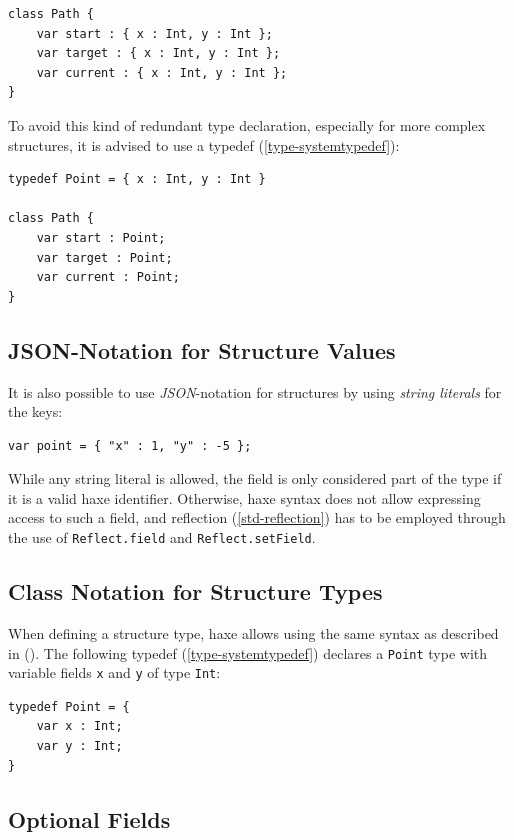\documentclass[a4paper,oneside]{book}
\newcommand{\type}[1]{\texttt{#1}}
\newcommand{\expr}[1]{\texttt{#1}}
\newcommand{\Fullref}[1]{\nameref{#1} (\Cref{#1})}
\newcommand{\tref}[2]{#1 (\ref{#2})}
\begin{document}
\begin{lstlisting}
class Path {
    var start : { x : Int, y : Int };
    var target : { x : Int, y : Int };
    var current : { x : Int, y : Int };
}
\end{lstlisting}
To avoid this kind of redundant type declaration, especially for more complex structures, it is advised to use a \tref{typedef}{type-systemtypedef}:

\begin{lstlisting}
typedef Point = { x : Int, y : Int }

class Path {
    var start : Point;
    var target : Point;
    var current : Point;
}
\end{lstlisting}


\subsection{JSON-Notation for Structure Values}
\label{types-structure-json-notation}

It is also possible to use \emph{JSON}-notation for structures by using \emph{string literals} for the keys:

\begin{lstlisting}
var point = { "x" : 1, "y" : -5 };
\end{lstlisting}
While any string literal is allowed, the field is only considered part of the type if it is a valid haxe identifier. Otherwise, haxe syntax does not allow expressing access to such a field, and \tref{reflection}{std-reflection} has to be employed through the use of \expr{Reflect.field} and \expr{Reflect.setField}.


\subsection{Class Notation for Structure Types}
\label{types-structure-class-notation}

When defining a structure type, haxe allows using the same syntax as described in \Fullref{class-field}. The following \tref{typedef}{type-systemtypedef} declares a \type{Point} type with variable fields \expr{x} and \expr{y} of type \type{Int}:

\begin{lstlisting}
typedef Point = {
    var x : Int;
    var y : Int;
}
\end{lstlisting}

\subsection{Optional Fields}
\label{types-structure-optional-fields}
\end{document}
